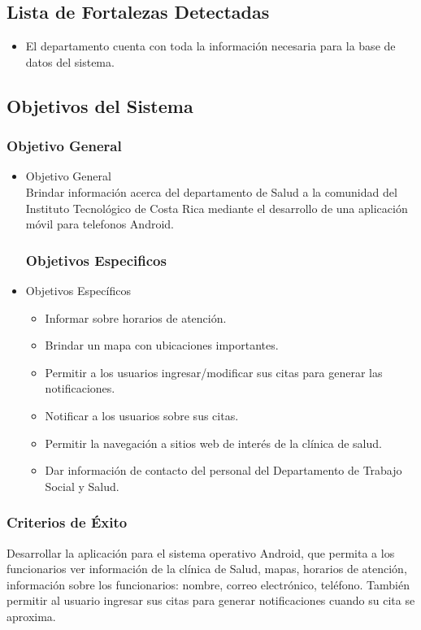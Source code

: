 \documentclass[12pt]{article}
\begin{document}
\subsection{Lista de Fortalezas Detectadas}
\begin{itemize}
	\item{El departamento cuenta con toda la informaci\'on necesaria para la base de datos del sistema.}
\end{itemize}

\subsection{Objetivos del Sistema}

\subsubsection{Objetivo General}

\begin{itemize}
\item{Objetivo General}
\\[0.1in]
Brindar informaci\'on acerca del departamento de Salud a la comunidad del Instituto Tecnol\'ogico de Costa Rica mediante el desarrollo de una aplicaci\'on m\'ovil para telefonos Android.

\subsubsection{Objetivos Especificos}

\item{Objetivos Espec\'ificos}
\begin{itemize}
	\item{Informar sobre horarios de atenci\'on.}
	\item{Brindar un mapa con ubicaciones importantes.}
	\item{Permitir a los usuarios ingresar/modificar sus citas para generar las notificaciones.}
	\item{Notificar a los usuarios sobre sus citas.}
	\item{Permitir la navegaci\'on a sitios web de inter\'es de la cl\'inica de salud.}
	\item{Dar informaci\'on de contacto del personal del Departamento de Trabajo Social y Salud.}
\end{itemize}
\end{itemize}

\subsubsection{Criterios de \'Exito}
Desarrollar la aplicaci\'on para el sistema operativo Android, que permita a los funcionarios ver informaci\'on de la cl\'inica de Salud, mapas, horarios de atenci\'on, informaci\'on sobre los funcionarios: nombre, correo electr\'onico, tel\'efono. Tambi\'en permitir al usuario ingresar sus citas para generar notificaciones cuando su cita se aproxima.
\end{document}
